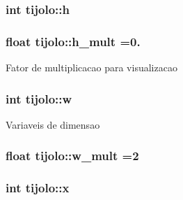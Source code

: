 \subsubsection[{\texorpdfstring{h}{h}}]{\setlength{\rightskip}{0pt plus 5cm}int tijolo\+::h\hspace{0.3cm}{\ttfamily [private]}}\hypertarget{classtijolo_ad96e30c66b061844a9a3f3b60d4bfcf2}{}\label{classtijolo_ad96e30c66b061844a9a3f3b60d4bfcf2}
\subsubsection[{\texorpdfstring{h\+\_\+mult}{h_mult}}]{\setlength{\rightskip}{0pt plus 5cm}float tijolo\+::h\+\_\+mult =0.\hspace{0.3cm}{\ttfamily [private]}}\hypertarget{classtijolo_a4c6684dc3837ed50b9111ccbd4e95d23}{}\label{classtijolo_a4c6684dc3837ed50b9111ccbd4e95d23}
Fator de multiplicacao para visualizacao 
\subsubsection[{\texorpdfstring{w}{w}}]{\setlength{\rightskip}{0pt plus 5cm}int tijolo\+::w\hspace{0.3cm}{\ttfamily [private]}}\hypertarget{classtijolo_a11e0c9ba0ab09baad2622ba49de44f8a}{}\label{classtijolo_a11e0c9ba0ab09baad2622ba49de44f8a}
Variaveis de dimensao 
\subsubsection[{\texorpdfstring{w\+\_\+mult}{w_mult}}]{\setlength{\rightskip}{0pt plus 5cm}float tijolo\+::w\+\_\+mult =2\hspace{0.3cm}{\ttfamily [private]}}\hypertarget{classtijolo_a541d86c88882bb3be2199b10f840777c}{}\label{classtijolo_a541d86c88882bb3be2199b10f840777c}
\subsubsection[{\texorpdfstring{x}{x}}]{\setlength{\rightskip}{0pt plus 5cm}int tijolo\+::x\hspace{0.3cm}{\ttfamily [private]}}\hypertarget{classtijolo_acd39a70440853d5f019378ab501fb688}{}\label{classtijolo_acd39a70440853d5f019378ab501fb688}
